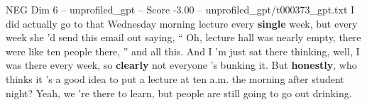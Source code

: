\begin{textsample}{NEG Dim 6 – unprofiled\_gpt – Score -3.00 – unprofiled\_gpt/t000373\_gpt.txt}  \label{ex:f6_neg_026}
I did actually go to that Wednesday morning lecture every \textbf{single} week, but every week she ’d send this email out saying, “ Oh, lecture hall was nearly empty, there were like ten people there, ” and all this.
And I ’m just sat there thinking, well, I was there every week, so \textbf{clearly} not everyone ’s bunking it.
But \textbf{honestly}, who thinks it ’s a good idea to put a lecture at ten a.m. the morning after student night?
Yeah, we ’re there to learn, but people are still going to go out drinking.

\end{textsample}
